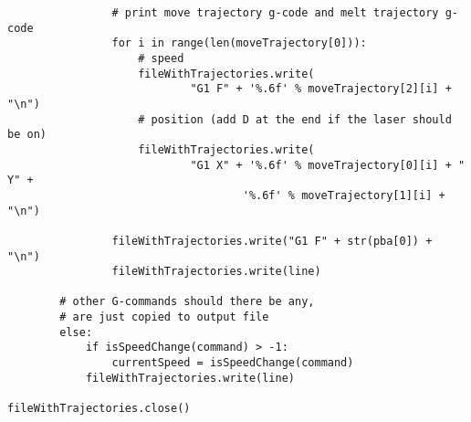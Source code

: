 \begin{verbatim}
                # print move trajectory g-code and melt trajectory g-code
                for i in range(len(moveTrajectory[0])):
                    # speed
                    fileWithTrajectories.write(
                            "G1 F" + '%.6f' % moveTrajectory[2][i] + "\n")
                    # position (add D at the end if the laser should be on)
                    fileWithTrajectories.write(
                            "G1 X" + '%.6f' % moveTrajectory[0][i] + " Y" +
                                    '%.6f' % moveTrajectory[1][i] + "\n")
                
                fileWithTrajectories.write("G1 F" + str(pba[0]) + "\n")
                fileWithTrajectories.write(line)

        # other G-commands should there be any,
        # are just copied to output file
        else: 
            if isSpeedChange(command) > -1: 
                currentSpeed = isSpeedChange(command)
            fileWithTrajectories.write(line)

fileWithTrajectories.close()

\end{verbatim}